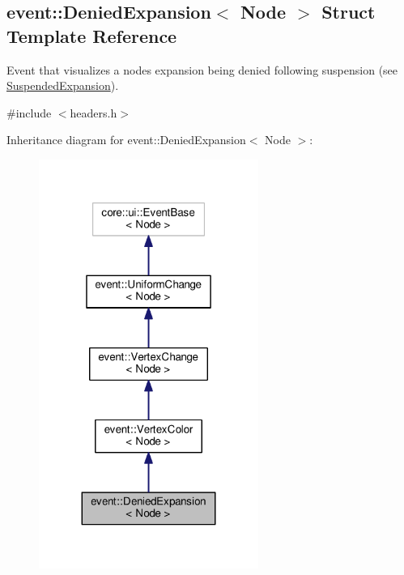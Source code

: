 \hypertarget{structevent_1_1DeniedExpansion}{}\subsection{event\+:\+:Denied\+Expansion$<$ Node $>$ Struct Template Reference}
\label{structevent_1_1DeniedExpansion}


Event that visualizes a node\textquotesingle{}s expansion being denied following suspension (see \hyperlink{structSuspendedExpansion}{Suspended\+Expansion}).  




{\ttfamily \#include $<$headers.\+h$>$}



Inheritance diagram for event\+:\+:Denied\+Expansion$<$ Node $>$\+:\nopagebreak
\begin{figure}[H]
\begin{center}
\leavevmode
\includegraphics[width=203pt]{structevent_1_1DeniedExpansion__inherit__graph}
\end{center}
\end{figure}


